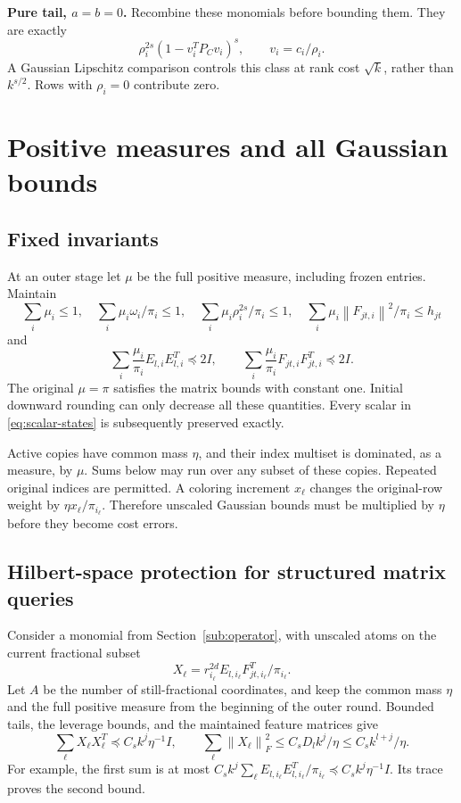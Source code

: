 \documentclass[11pt]{article}
\theoremstyle{remark}\newtheorem{remark}[theorem]{Remark}
\newcommand{\norm}[1]{\left\|#1\right\|}\newcommand{\ip}[2]{\left\langle #1,#2\right\rangle}
\begin{document}
\textbf{Pure tail, $a=b=0$.} Recombine these monomials before bounding them. They are exactly
\begin{equation}\label{eq:pure-tail}
 \rho_i^{2s}(1-v_i^TP_Cv_i)^s,\qquad v_i=c_i/\rho_i.
\end{equation}
A Gaussian Lipschitz comparison controls this class at rank cost $\sqrt{k}$, rather than $k^{s/2}$. Rows with $\rho_i=0$ contribute zero.

\section{Positive measures and all Gaussian bounds}\label{sec:gaussian-bounds}
\subsection{Fixed invariants}
At an outer stage let $\mu$ be the full positive measure, including frozen entries. Maintain
\begin{equation}\label{eq:scalar-states}
 \sum_i\mu_i\le1,\quad \sum_i\mu_i\omega_i/\pi_i\le1,\quad
 \sum_i\mu_i\rho_i^{2s}/\pi_i\le1,\quad
 \sum_i\mu_i\norm{F_{jt,i}}^2/\pi_i\le h_{jt}
\end{equation}
and
\begin{equation}\label{eq:matrix-states}
 \sum_i\frac{\mu_i}{\pi_i}E_{l,i}E_{l,i}^T\preceq2I,\qquad
 \sum_i\frac{\mu_i}{\pi_i}F_{jt,i}F_{jt,i}^T\preceq2I.
\end{equation}
The original $\mu=\pi$ satisfies the matrix bounds with constant one. Initial downward rounding can only decrease all these quantities. Every scalar in \eqref{eq:scalar-states} is subsequently preserved exactly.

Active copies have common mass $\eta$, and their index multiset is dominated, as a measure, by $\mu$. Sums below may run over any subset of these copies. Repeated original indices are permitted. A coloring increment $x_\ell$ changes the original-row weight by $\eta x_\ell/\pi_{i_\ell}$. Therefore unscaled Gaussian bounds must be multiplied by $\eta$ before they become cost errors.

\subsection{Hilbert-space protection for structured matrix queries}\label{sub:new-protection}
Consider a monomial from Section~\ref{sub:operator}, with unscaled atoms on the current fractional subset
\[
 X_\ell=r_{i_\ell}^{2d}E_{l,i_\ell}F_{jt,i_\ell}^T/\pi_{i_\ell}.
\]
Let $A$ be the number of still-fractional coordinates, and keep the common mass $\eta$ and the full positive measure from the beginning of the outer round. Bounded tails, the leverage bounds, and the maintained feature matrices give
\begin{equation}\label{eq:new-left-trace}
 \sum_\ell X_\ell X_\ell^T\preceq C_s k^j\eta^{-1}I,
 \qquad \sum_\ell\norm{X_\ell}_F^2\le C_s D_l k^j/\eta\le C_s k^{l+j}/\eta.
\end{equation}
For example, the first sum is at most $C_s k^j\sum_\ell E_{l,i_\ell}E_{l,i_\ell}^T/\pi_{i_\ell}\preceq C_s k^j\eta^{-1}I$. Its trace proves the second bound.
\end{document}
